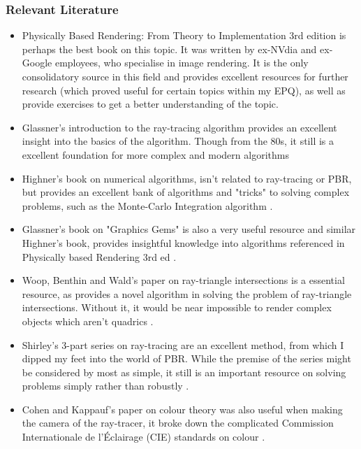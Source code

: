 \documentclass[../main.tex]{subfiles}
\begin{document}
\subsubsection{Relevant Literature}
\begin{itemize}
  \item Physically Based Rendering: From Theory to Implementation 3rd edition \cite{pharrPhysicallyBasedRendering2016} is perhaps the best book on this topic. It was written by ex-NVdia and ex-Google employees, who specialise in image rendering. It is the only consolidatory source in this field and provides excellent resources for further research (which proved useful for certain topics within my EPQ), as well as provide exercises to get a better understanding of the topic.
  \item Glassner's introduction to the ray-tracing algorithm provides an excellent insight into the basics of the algorithm. Though from the 80s, it still is a excellent foundation for more complex and modern algorithms \cite{glassnerIntroductionRayTracing1989}  
  \item Highner's book on numerical algorithms, isn't related to ray-tracing or PBR, but provides an excellent bank of algorithms and "tricks" to solving complex problems, such as the Monte-Carlo Integration algorithm \cite{highamAccuracyStabilityNumerical2002a}.
  \item Glassner's book on "Graphics Gems" is also a very useful resource and similar Highner's book, provides insightful knowledge into algorithms referenced in Physically based Rendering 3rd ed \cite{approfessionalfirmAPProfessionalGraphics1995}.
  \item Woop, Benthin and Wald's paper on ray-triangle intersections is a essential resource, as provides a novel algorithm in solving the problem of ray-triangle intersections. Without it, it would be near impossible to render complex objects which aren't quadrics \cite{woopWatertightRayTriangle2013}.
  \item Shirley's 3-part series on ray-tracing are an excellent method, from which I dipped my feet into the world of PBR. While the premise of the series might be considered by most as simple, it still is an important resource on solving problems simply rather than robustly \cite{petershirleytrevordavidblackstevehollaschRayTracingOne}.
  \item Cohen and Kappauf's paper on colour theory was also useful when making the camera of the ray-tracer, it broke down the complicated Commission Internationale de l’Éclairage (CIE) standards on colour \cite{cohenColorMixtureFundamental1985}.
\end{itemize}
\end{document}
